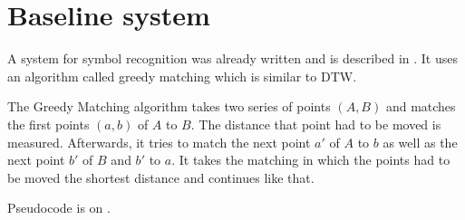 
\chapter{Baseline system} %
\label{ch:Content1}


A system for symbol recognition was already written and is described in \cite{Kirsch}.
It uses an algorithm called greedy matching which is similar to \Gls{DTW}.

The Greedy Matching algorithm takes two series of points $(A, B)$ and matches
the first points $(a,b)$ of $A$ to $B$. The distance that point had to be moved is
measured. Afterwards, it tries to match the next point $a'$ of $A$ to $b$ as
well as the next point $b'$ of $B$ and $b'$ to $a$. It takes the matching in
which the points had to be moved the shortest distance and continues like that.

Pseudocode is on .